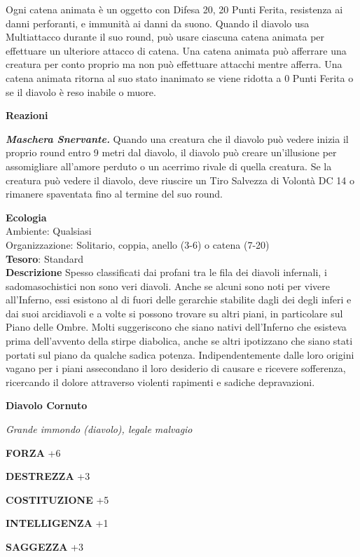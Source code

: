 \begin{multicols}{2}
Ogni catena animata è un oggetto con Difesa 20, 20 Punti Ferita, resistenza ai danni perforanti, e immunità ai danni da suono. Quando il diavolo usa Multiattacco durante il suo round, può usare ciascuna catena animata per effettuare un ulteriore attacco di catena. Una catena animata può afferrare una creatura per conto proprio ma non può effettuare attacchi mentre afferra. Una catena animata ritorna al suo stato inanimato se viene ridotta a 0 Punti Ferita o se il diavolo è reso inabile o muore.

\textbf{Reazioni}

\textit{\textbf{Maschera Snervante.}} Quando una creatura che il diavolo può vedere inizia il proprio round entro 9 metri dal diavolo, il diavolo può creare un'illusione per assomigliare all'amore perduto o un acerrimo rivale di quella creatura. Se la creatura può vedere il diavolo, deve riuscire un Tiro Salvezza di Volontà DC 14 o rimanere spaventata fino al termine del suo round.

\textbf{Ecologia}\\
Ambiente: Qualsiasi\\
Organizzazione: Solitario, coppia, anello (3-6) o catena (7-20)\\
\textbf{Tesoro}: Standard\\
\textbf{Descrizione}
Spesso classificati dai profani tra le fila dei diavoli infernali, i sadomasochistici non sono veri diavoli. Anche se alcuni sono noti per vivere all'Inferno, essi esistono al di fuori delle gerarchie stabilite dagli dei degli inferi e dai suoi arcidiavoli e a volte si possono trovare su altri piani, in particolare sul Piano delle Ombre. Molti suggeriscono che siano nativi dell'Inferno che esisteva prima dell'avvento della stirpe diabolica, anche se altri ipotizzano che siano stati portati sul piano da qualche sadica potenza. Indipendentemente dalle loro origini vagano per i piani assecondano il loro desiderio di causare e ricevere sofferenza, ricercando il dolore attraverso violenti rapimenti e sadiche depravazioni.


\medskip{}\textbf{Diavolo Cornuto}

\textit{Grande immondo (diavolo), legale malvagio}

\textbf{FORZA} +6

\textbf{DESTREZZA} +3

\textbf{COSTITUZIONE} +5

\textbf{INTELLIGENZA} +1

\textbf{SAGGEZZA} +3


\end{multicols}
